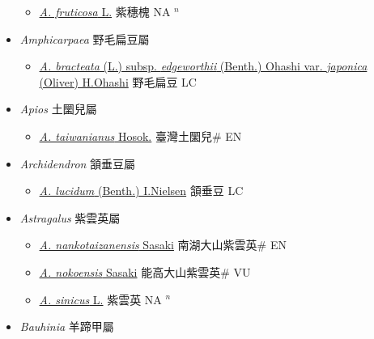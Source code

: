 \begin{itemize}
  \begin{itemize}
        \item[] \href{http://www.theplantlist.org/tpl1.1/search?q=Amorpha+fruticosa}{\textit{A. fruticosa} L.}   紫穗槐 NA $^n$
  \end{itemize}
 \item[] \textit{Amphicarpaea} 野毛扁豆屬
                    
  \begin{itemize}
        \item[] \href{http://www.theplantlist.org/tpl1.1/search?q=Amphicarpaea+bracteata+subsp.+edgeworthii+var.+japonica}{\textit{A. bracteata} (L.) subsp. \textit{edgeworthii} (Benth.) Ohashi var. \textit{japonica} (Oliver) H.Ohashi}   野毛扁豆 LC
  \end{itemize}
 \item[] \textit{Apios} 土圞兒屬
                    
  \begin{itemize}
        \item[] \href{http://www.theplantlist.org/tpl1.1/search?q=Apios+taiwanianus}{\textit{A. taiwanianus} Hosok.}   臺灣土圞兒\# EN
  \end{itemize}
 \item[] \textit{Archidendron} 頷垂豆屬
                    
  \begin{itemize}
        \item[] \href{http://www.theplantlist.org/tpl1.1/search?q=Archidendron+lucidum}{\textit{A. lucidum} (Benth.) I.Nielsen}   頷垂豆 LC
  \end{itemize}
 \item[] \textit{Astragalus} 紫雲英屬
                    
  \begin{itemize}
        \item[] \href{http://www.theplantlist.org/tpl1.1/search?q=Astragalus+nankotaizanensis}{\textit{A. nankotaizanensis} Sasaki}   南湖大山紫雲英\# EN
        \item[] \href{http://www.theplantlist.org/tpl1.1/search?q=Astragalus+nokoensis}{\textit{A. nokoensis} Sasaki}   能高大山紫雲英\# VU
        \item[] \href{http://www.theplantlist.org/tpl1.1/search?q=Astragalus+sinicus}{\textit{A. sinicus} L.}   紫雲英 NA $^n$
  \end{itemize}
 \item[] \textit{Bauhinia} 羊蹄甲屬
                    

\end{itemize}
